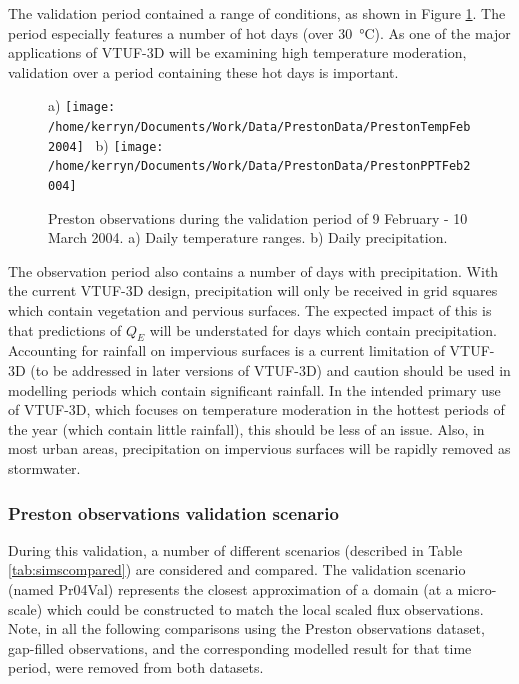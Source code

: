 \documentclass[preprint,12pt,authoryear]{elsarticle}
\begin{document}
The validation period contained a range of conditions, as shown in Figure \ref{fig:Prestontemprain}. The period especially features a number of hot days (over \SI{30}{\degreeCelsius}). As one of the major applications of VTUF-3D will be examining high temperature moderation, validation over a period containing these hot days is important. 

\begin{figure}[!htbp]a)
{\texttt{[image: /home/kerryn/Documents/Work/Data/PrestonData/PrestonTempFeb2004]} }
~b)
{\texttt{[image: /home/kerryn/Documents/Work/Data/PrestonData/PrestonPPTFeb2004]} }
    \caption{Preston observations during the validation period of 9 February - 10 March 2004. a) Daily temperature ranges. b) Daily precipitation. \label{fig:Prestontemprain}}    
\end{figure}

The observation period also contains a number of days with precipitation. With the current VTUF-3D design, precipitation will only be received in grid squares which contain vegetation and pervious surfaces. The expected impact of this is that predictions of $Q_{E}$ will be understated for days which contain precipitation. Accounting for rainfall on impervious surfaces is a current limitation of VTUF-3D (to be addressed in later versions of VTUF-3D) and caution should be used in modelling periods which contain significant rainfall. In the intended primary use of VTUF-3D, which focuses on temperature moderation in the hottest periods of the year (which contain little rainfall), this should be less of an issue. Also, in most urban areas, precipitation on impervious surfaces will be rapidly removed as stormwater.


\subsubsection{Preston observations validation scenario}\label{sec:prvalresults}

During this validation, a number of different scenarios (described in Table \ref{tab:simscompared}) are considered and compared. The validation scenario (named Pr04Val) represents the closest approximation of a domain (at a micro-scale) which could be constructed to match the local scaled flux observations. Note, in all the following comparisons using the Preston observations dataset, gap-filled observations, and the corresponding modelled result for that time period, were removed from both datasets.
\end{document}
